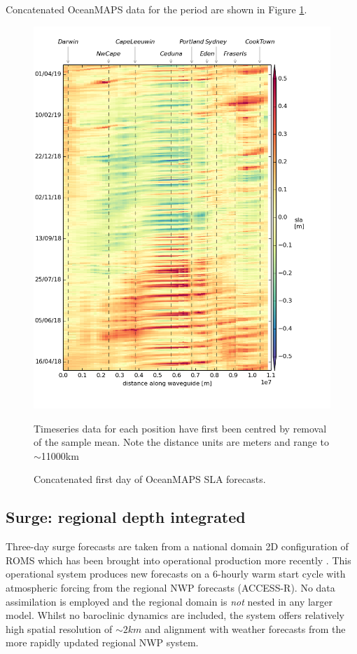 Concatenated OceanMAPS data for the period are shown in Figure \ref{fig:hov_eg}. 
\begin{figure}[!hbt] \centering
    \includegraphics[width=\figwidthFull]{figures/plots/concat_sla_day0_full.png}
    \caption{Concatenated first day of OceanMAPS SLA forecasts.} 
    {Timeseries data for each position have first been centred by removal of the sample mean. Note the distance units are meters and range to $\sim$11000km}
    \label{fig:hov_eg}
\end{figure} 

\subsection{Surge: regional depth integrated  }
\label{sec:roms}
Three-day surge forecasts are taken from a national domain 2D configuration of ROMS \citep{Shchepetkin:2005eh} which has been brought into operational production more recently \citep{Allen:2018aa}.  
This operational system produces new forecasts on a 6-hourly warm start cycle with atmospheric forcing from the regional NWP forecasts (ACCESS-R).
No data assimilation is employed and the regional domain is \emph{not} nested in any larger model.
Whilst no baroclinic dynamics are included, the system offers relatively high spatial resolution of $\sim2km$ and alignment with weather forecasts from the more rapidly updated regional NWP system.


